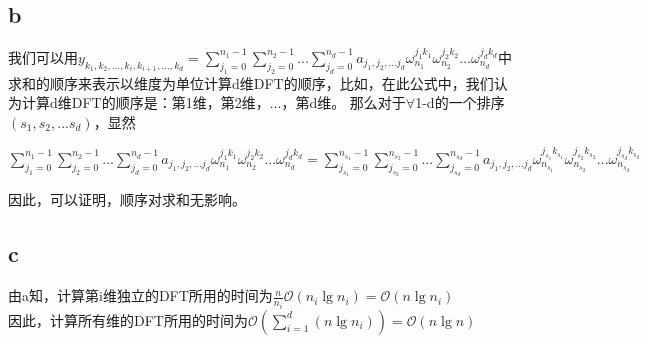 \documentclass[UTF8]{ctexart}
\begin{document}
\subsection{b}
我们可以用$y_{k_1,k_2,...,k_i,k_{i+1},...,k_d}=\sum\limits_{j_1=0}^{n_1-1}\sum\limits_{j_2=0}^{n_2-1}...\sum\limits_{j_d=0}^{n_d-1}a_{j_1,j_2,...j_d}\omega^{j_1k_1}_{n_1}\omega^{j_2k_2}_{n_2}...\omega^{j_dk_d}_{n_d}$中求和的顺序来表示以维度为单位计算d维DFT的顺序，比如，在此公式中，我们认为计算d维DFT的顺序是：第1维，第2维，...，第d维。
那么对于$\forall$1-d的一个排序$(s_1,s_2,...s_d)$，显然
\begin{center}
$\sum\limits_{j_1=0}^{n_1-1}\sum\limits_{j_2=0}^{n_2-1}...\sum\limits_{j_d=0}^{n_d-1}a_{j_1,j_2,...j_d}\omega^{j_1k_1}_{n_1}\omega^{j_2k_2}_{n_2}...\omega^{j_dk_d}_{n_d}=\sum\limits_{j_{s_1}=0}^{n_{s_1}-1}\sum\limits_{j_{s_2}=0}^{n_{s_2}-1}...\sum\limits_{j_{s_d}=0}^{n_{s_d}-1}a_{j_1,j_2,...j_d}\omega^{j_{s_1}k_{s_1}}_{n_{s_1}}\omega^{j_{s_2}k_{s_2}}_{n_{s_2}}...\omega^{j_{s_d}k_{s_d}}_{n_{s_d}}$
\end{center}
因此，可以证明，顺序对求和无影响。
\subsection{c}
由a知，计算第i维独立的DFT所用的时间为$\frac{n}{n_i}\mathcal{O}(n_i\lg n_i)=\mathcal{O}(n\lg n_i)$\\
因此，计算所有维的DFT所用的时间为$\mathcal{O}(\sum\limits_{i=1}^{d}(n\lg n_i))=\mathcal{O}(n\lg n)$
\end{document}
